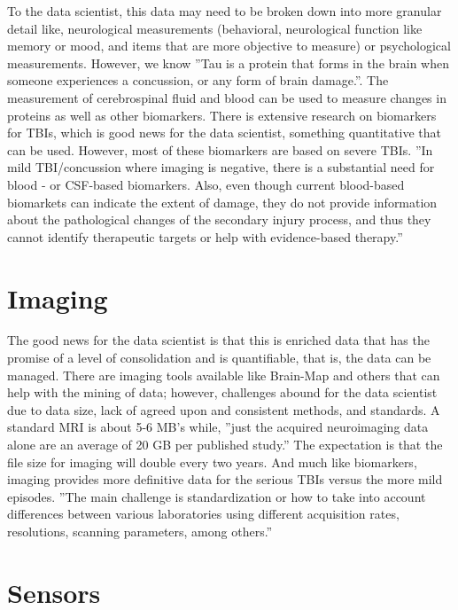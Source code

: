 \documentclass[sigconf]{acmart}
\begin{document}
To the data scientist, this data may need to be broken down into more granular detail like, neurological measurements (behavioral, neurological function like memory or mood, and items that are more objective to measure) or psychological measurements.  However, we know ''Tau is a protein that forms in the brain when someone experiences a concussion, or any form of brain damage.''.\cite{www-eptechview-tthuhsc-edu}  The measurement of cerebrospinal fluid and blood can be used to measure changes in proteins as well as other biomarkers.  There is extensive research on biomarkers for TBIs, which is good news for the data scientist, something quantitative that can be used.  However, most of these biomarkers are based on severe TBIs.  ''In mild TBI/concussion where imaging is negative, there is a substantial need for blood - or CSF-based biomarkers.  Also, even though current blood-based biomarkets can indicate the extent of damage, they do not provide information about the pathological changes of the secondary injury process, and thus they cannot identify therapeutic targets or help with evidence-based therapy.''\cite{www-futuremedicine-com}

\section{Imaging}

The good news for the data scientist is that this is enriched data that has the promise of a level of consolidation and is quantifiable, that is, the data can be managed.  There are imaging tools available like Brain-Map and others that can help with the mining of data; however, challenges abound for the data scientist due to data size, lack of agreed upon and consistent methods, and standards.  A standard MRI is about 5-6 MB's while, ''just the acquired neuroimaging data alone are an average of 20 GB per published study.'' \cite{www-futuremedicine-com} The expectation is that the file size for imaging will double every two years.  And much like biomarkers, imaging provides more definitive data for the serious TBIs versus the more mild episodes.  ''The main challenge is standardization or how to take into account differences between various laboratories using different acquisition rates, resolutions, scanning parameters, among others.''\cite{www-futuremedicine-com}

\section{Sensors}
\end{document}
